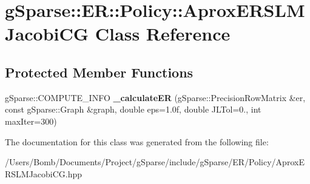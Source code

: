 \hypertarget{classg_sparse_1_1_e_r_1_1_policy_1_1_aprox_e_r_s_l_m_jacobi_c_g}{}\section{g\+Sparse\+:\+:ER\+:\+:Policy\+:\+:Aprox\+E\+R\+S\+L\+M\+Jacobi\+CG Class Reference}
\label{classg_sparse_1_1_e_r_1_1_policy_1_1_aprox_e_r_s_l_m_jacobi_c_g}
\subsection*{Protected Member Functions}
\begin{DoxyCompactItemize}
\item 
\mbox{\label{classg_sparse_1_1_e_r_1_1_policy_1_1_aprox_e_r_s_l_m_jacobi_c_g_a0174f484153579201e058996a3d19564}} 
g\+Sparse\+::\+C\+O\+M\+P\+U\+T\+E\+\_\+\+I\+N\+FO {\bfseries \+\_\+calculate\+ER} (g\+Sparse\+::\+Precision\+Row\+Matrix \&er, const g\+Sparse\+::\+Graph \&graph, double eps=1.\+0f, double J\+L\+Tol=0., int max\+Iter=300)
\end{DoxyCompactItemize}


The documentation for this class was generated from the following file\+:\begin{DoxyCompactItemize}
\item 
/\+Users/\+Bomb/\+Documents/\+Project/g\+Sparse/include/g\+Sparse/\+E\+R/\+Policy/Aprox\+E\+R\+S\+L\+M\+Jacobi\+C\+G.\+hpp\end{DoxyCompactItemize}
